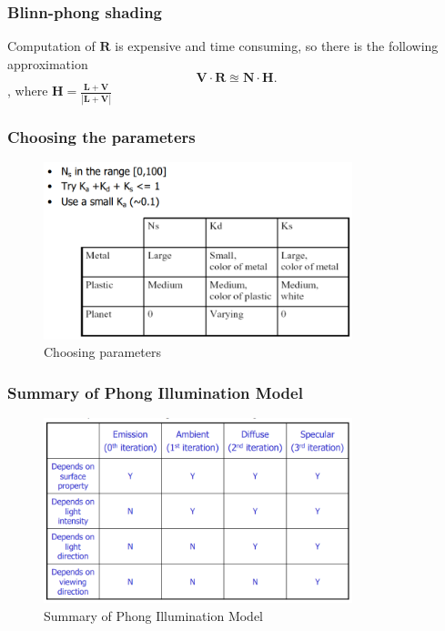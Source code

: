 \documentclass[11pt]{article}
\begin{document}
\subsubsection*{Blinn-phong shading}
Computation of $\mathbf{R}$ is expensive and time consuming, so there is the following approximation
\[
\mathbf{V\cdot R \approxeq N \cdot H}
.\], where $\mathbf{H = \frac{L+V}{|L+V|}}$ 


\subsubsection*{Choosing the parameters}
\begin{figure}[H]
    \centering
    \includegraphics[width=0.8\textwidth]{ns_kd_ks_param.png}
    \caption{Choosing parameters}
    \label{fig:ns_kd_ks_param}
\end{figure}

\subsubsection*{Summary of Phong Illumination Model}
\begin{figure}[H]
    \centering
    \includegraphics[width=0.8\textwidth]{phong_ill.png}
    \caption{Summary of Phong Illumination Model}
    \label{fig:phong_summ}
\end{figure}
\end{document}
